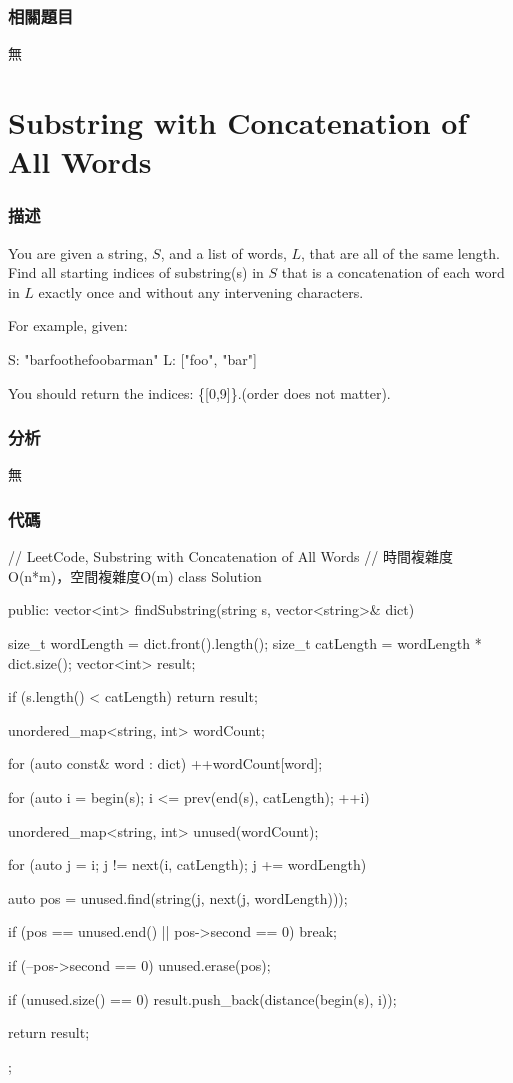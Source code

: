 \subsubsection{相關題目}

\begindot
\item 無
\myenddot


\section{Substring with Concatenation of All Words} %
\label{sec:substring-with-concatenation-of-all-words}


\subsubsection{描述}
You are given a string, $S$, and a list of words, $L$, that are all of the same length. Find all starting indices of substring(s) in $S$ that is a concatenation of each word in $L$ exactly once and without any intervening characters.

For example, given:
\begin{Code}
S: "barfoothefoobarman"
L: ["foo", "bar"]
\end{Code}

You should return the indices: \code\{[0,9]\}.(order does not matter).


\subsubsection{分析}
無


\subsubsection{代碼}
\begin{Code}
// LeetCode, Substring with Concatenation of All Words
// 時間複雜度O(n*m)，空間複雜度O(m)
class Solution {
public:
    vector<int> findSubstring(string s, vector<string>& dict) {
        size_t wordLength = dict.front().length();
        size_t catLength = wordLength * dict.size();
        vector<int> result;

        if (s.length() < catLength) return result;

        unordered_map<string, int> wordCount;

        for (auto const& word : dict) ++wordCount[word];

        for (auto i = begin(s); i <= prev(end(s), catLength); ++i) {
            unordered_map<string, int> unused(wordCount);

            for (auto j = i; j != next(i, catLength); j += wordLength) {
                auto pos = unused.find(string(j, next(j, wordLength)));

                if (pos == unused.end() || pos->second == 0) break;

                if (--pos->second == 0) unused.erase(pos);
            }

            if (unused.size() == 0) result.push_back(distance(begin(s), i));
        }

        return result;
    }
};
\end{Code}


